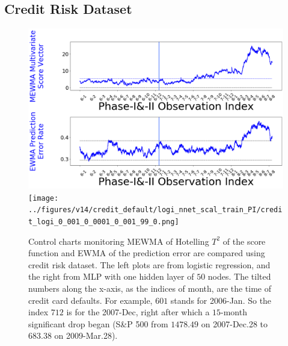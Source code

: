 \documentclass[twoside,11pt]{article}
\begin{document}
\subsection{Credit Risk Dataset}
\label{ss:cr_ds}
\begin{figure}[!htbp]
\centering
	\includegraphics[width = 0.49\linewidth, trim=0in 2.6in 0in 0in, clip]{../figures/v14/credit_default/logi_scal_train_PI/credit_logi_1e-08_0_0001_0_001_99_0.png}
\texttt{[image: ../figures/v14/credit\_default/logi\_nnet\_scal\_train\_PI/credit\_logi\_0\_001\_0\_0001\_0\_001\_99\_0.png]}
  \caption{
Control charts monitoring MEWMA of Hotelling $T^2$ of the score function and EWMA of the prediction error are compared using credit risk dataset. The left plots are from logistic regression, and the right from MLP with one hidden layer of $50$ nodes. The tilted numbers along the x-axis, as the indices of month, are the time of credit card defaults. For example, $601$ stands for 2006-Jan. So the index $712$ is for the 2007-Dec, right after which a $15$-month significant drop began (S\&P 500 from $1478.49$ on 2007-Dec.28 to $683.38$ on 2009-Mar.28).
}
\label{fig:credit_default}
\end{figure}
\end{document}
